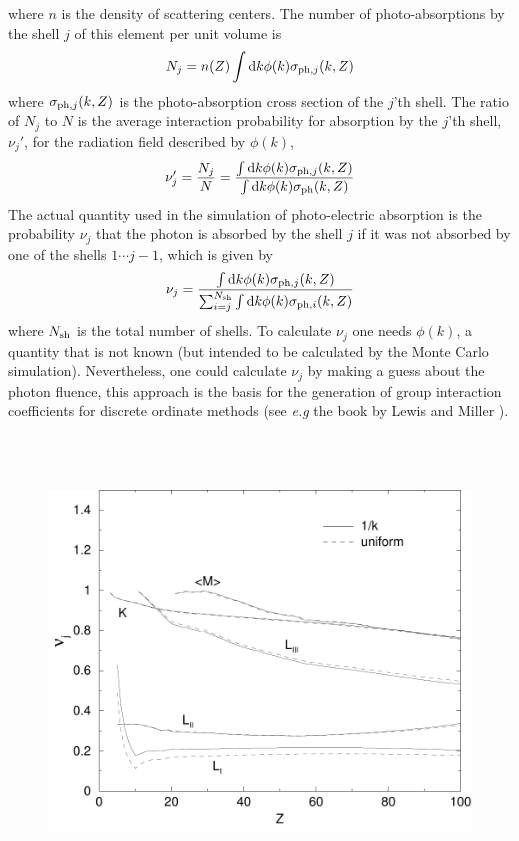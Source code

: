 \begin{enumerate}
where $n$ is the density of scattering centers.
The number of photo-absorptions by the shell $j$ of this
element per unit volume is
\begin{equation}
N_j = n(Z) \int {\rm d} k \phi(k) \sigma_{{\rm ph},j}(k,Z)
\end{equation}
where $\sigma_{{\rm ph},j}(k,Z)$ is the photo-absorption cross section
of the $j$'th shell. The ratio of $N_j$ to $N$ is the average
interaction probability for absorption by the $j$'th shell, $\nu_j'$,
for the radiation field described by $\phi(k)$,
\begin{equation}
\nu_j' = \frac{N_j}{N} = {\int {\rm d} k \phi(k) \sigma_{{\rm ph},j}(k,Z)
\over \int {\rm d} k \phi(k) \sigma_{\rm ph}(k,Z) }
\end{equation}
The actual quantity used in the simulation of photo-electric absorption
is the probability $\nu_j$ that the photon is absorbed by the
shell $j$  if it was not absorbed by one of the shells $1 \cdots j-1$,
which is given by
\begin{equation}
\label{photo_nuj}
\nu_j = {\int {\rm d} k \phi(k) \sigma_{{\rm ph},j}(k,Z) \over
\sum_{i=j}^{N_{\rm sh}} \int {\rm d} k \phi(k) \sigma_{{\rm ph},i}(k,Z)}
\end{equation}
where $N_{\rm sh}$ is the total number of shells.
To calculate $\nu_j$ one needs $\phi(k)$, a quantity that
is not known (but intended to be calculated by the Monte
Carlo simulation). Nevertheless, one could calculate
$\nu_j$ by making a guess about the photon fluence, this
approach is the basis for the generation of group interaction
coefficients for discrete ordinate methods (see {\em e.g}
the book by Lewis and Miller \cite{LM84}).
\begin{figure}[h]
\includegraphics[height=12cm,width=12cm]{figures/intp}

\end{figure}
\end{enumerate}
